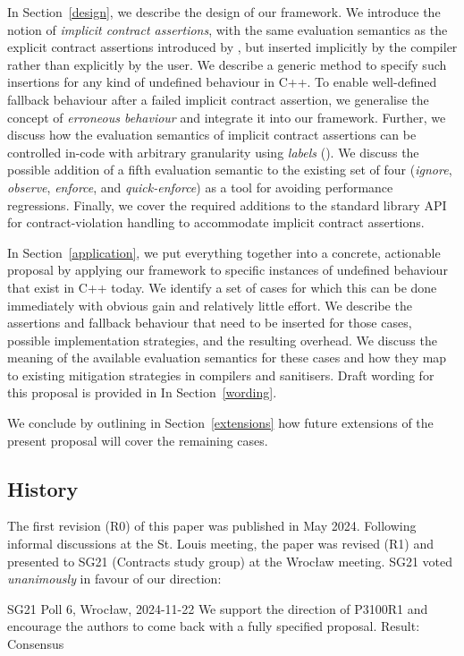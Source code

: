 In Section~\ref{design}, we describe the design of our framework. We introduce the notion of \emph{implicit contract assertions}, with the same evaluation semantics as the explicit contract assertions introduced by \cite{P2900R14}, but inserted implicitly by the compiler rather than explicitly by the user. We describe a generic method to specify such insertions for any kind of undefined behaviour in C++. To enable well-defined fallback behaviour after a failed implicit contract assertion, we generalise the concept of \emph{erroneous behaviour} and integrate it into our framework. Further, we discuss how the evaluation semantics of implicit contract assertions can be controlled in-code with arbitrary granularity using \emph{labels} (\cite{P3400R1}). We discuss the possible addition of a fifth evaluation semantic to the existing set of four (\emph{ignore}, \emph{observe}, \emph{enforce}, and \emph{quick-enforce}) as a tool for avoiding performance regressions. Finally, we cover the required additions to the standard library API for contract-violation handling to accommodate implicit contract assertions.

In Section~\ref{application}, we put everything together into a concrete, actionable proposal by applying our framework to specific instances of undefined behaviour that exist in C++ today. We identify a set of cases for which this can be done immediately with obvious gain and relatively little effort. We describe the assertions and fallback behaviour that need to be inserted for those cases, possible implementation strategies, and the resulting overhead. We discuss the meaning of the available evaluation semantics for these cases and how they map to existing mitigation strategies in compilers and sanitisers. Draft wording for this proposal is provided in In Section~\ref{wording}.

We conclude by outlining in Section~\ref{extensions} how future extensions of the present proposal will cover the remaining cases.

\subsection{History}
\label{history}

The first revision (R0) of this paper was published in May 2024. Following informal discussions at the St. Louis meeting, the paper was revised (R1) and presented to SG21 (Contracts study group) at the Wroc{\l}aw meeting. SG21 voted \emph{unanimously} in favour of our direction:
\vspace{2mm}
\begin{wgpoll}{{SG21 Poll 6, Wroc{\l}aw, 2024-11-22}}
We support the direction of P3100R1 and encourage the authors to come back with a fully specified proposal.
Result: Consensus
\end{wgpoll}
\vspace{2mm}


